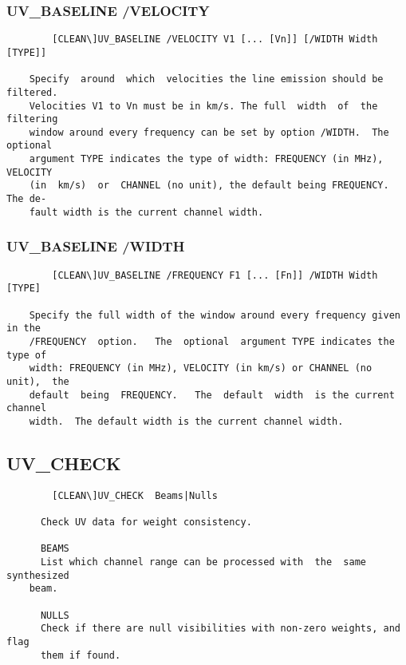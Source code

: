 \subsubsection{UV\_BASELINE /VELOCITY}
\begin{verbatim}
        [CLEAN\]UV_BASELINE /VELOCITY V1 [... [Vn]] [/WIDTH Width [TYPE]]

    Specify  around  which  velocities the line emission should be filtered.
    Velocities V1 to Vn must be in km/s. The full  width  of  the  filtering
    window around every frequency can be set by option /WIDTH.  The optional
    argument TYPE indicates the type of width: FREQUENCY (in MHz),  VELOCITY
    (in  km/s)  or  CHANNEL (no unit), the default being FREQUENCY.  The de-
    fault width is the current channel width.

\end{verbatim}
\subsubsection{UV\_BASELINE /WIDTH}
\begin{verbatim}
        [CLEAN\]UV_BASELINE /FREQUENCY F1 [... [Fn]] /WIDTH Width [TYPE]

    Specify the full width of the window around every frequency given in the
    /FREQUENCY  option.   The  optional  argument TYPE indicates the type of
    width: FREQUENCY (in MHz), VELOCITY (in km/s) or CHANNEL (no unit),  the
    default  being  FREQUENCY.   The  default  width  is the current channel
    width.  The default width is the current channel width.

\end{verbatim}
\subsection{UV\_CHECK}
\begin{verbatim}
        [CLEAN\]UV_CHECK  Beams|Nulls

      Check UV data for weight consistency.

      BEAMS
      List which channel range can be processed with  the  same  synthesized
    beam.

      NULLS
      Check if there are null visibilities with non-zero weights, and flag
      them if found.


\end{verbatim}
